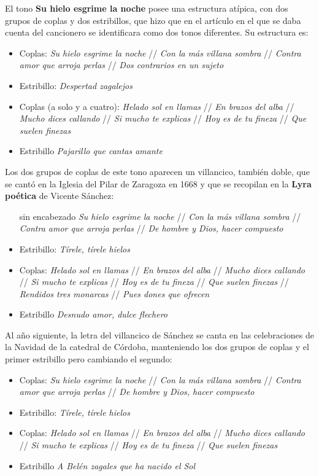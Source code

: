 El tono \textbf{Su hielo esgrime la noche} posee una estructura atípica, con dos grupos de coplas y dos estribillos, que hizo que en el artículo en el que se daba cuenta del cancionero se identificara como dos tonos diferentes. Su estructura es:

\begin{itemize}
\item Coplas: \textit{Su hielo esgrime la noche} // \textit{Con la más villana sombra} // \textit{Contra amor que arroja perlas} // \textit{Dos contrarios en un sujeto}
	\item Estribillo: \textit{Despertad zagalejos}
	\item Coplas (a solo y a cuatro): \textit{Helado sol en llamas} // \textit{En brazos del alba} // \textit{Mucho dices callando} // \textit{Si mucho te explicas} // \textit{Hoy es de tu fineza} // \textit{Que suelen finezas} 
	\item Estribillo \textit{Pajarillo que cantas amante}
\end{itemize}

Los dos grupos de coplas de este tono aparecen un villancico, también doble, que se cantó en la Iglesia del Pilar de Zaragoza en 1668 y que se recopilan en la \textbf{\textbf{Lyra poética}} de Vicente Sánchez:

\begin{itemize}
	\item [sin encabezado] \textit{Su hielo esgrime la noche} // \textit{Con la más villana sombra} // \textit{Contra amor que arroja perlas} // \textit{De hombre y Dios, hacer compuesto}
	\item Estribillo: \textit{Tírele, tírele hielos}
	\item Coplas: \textit{Helado sol en llamas} // \textit{En brazos del alba} // \textit{Mucho dices callando} // \textit{Si mucho te explicas} // \textit{Hoy es de tu fineza} // \textit{Que suelen finezas} // \textit{Rendidos tres monarcas} //  \textit{Pues dones que ofrecen}
	\item Estribillo \textit{Desnudo amor, dulce flechero}
\end{itemize}

Al año siguiente, la letra del villancico de Sánchez se canta en las celebraciones de la Navidad de la catedral de Córdoba, manteniendo los dos grupos de coplas y el primer estribillo pero cambiando el segundo:

\begin{itemize}
	\item Coplas: \textit{Su hielo esgrime la noche} // \textit{Con la más villana sombra} // \textit{Contra amor que arroja perlas} // \textit{De hombre y Dios, hacer compuesto}
	\item Estribillo: \textit{Tírele, tírele hielos}
	\item Coplas: \textit{Helado sol en llamas} // \textit{En brazos del alba} // \textit{Mucho dices callando} // \textit{Si mucho te explicas} // \textit{Hoy es de tu fineza} // \textit{Que suelen finezas}
	\item Estribillo \textit{A Belén zagales que ha nacido el Sol}
\end{itemize}


